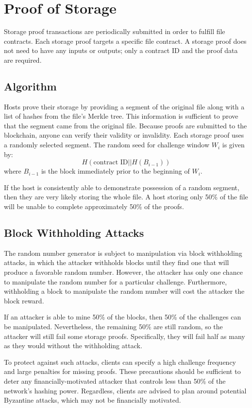 \documentclass[twocolumn]{article}
\begin{document}
\section{Proof of Storage}
\label{sec:storage}
Storage proof transactions are periodically submitted in order to fulfill file contracts.
Each storage proof targets a specific file contract.
A storage proof does not need to have any inputs or outputs; only a contract ID and the proof data are required.

\subsection{Algorithm}
Hosts prove their storage by providing a segment of the original file along with a list of hashes from the file's Merkle tree.
This information is sufficient to prove that the segment came from the original file.
Because proofs are submitted to the blockchain, anyone can verify their validity or invalidity.
Each storage proof uses a randomly selected segment.
The random seed for challenge window $W_i$ is given by:
\[
	H(\text{contract ID} || H(B_{i-1}))
\]
where $B_{i-1}$ is the block immediately prior to the beginning of $W_i$.

If the host is consistently able to demonstrate possession of a random segment, then they are very likely storing the whole file.
A host storing only 50\% of the file will be unable to complete approximately 50\% of the proofs.

\subsection{Block Withholding Attacks}
The random number generator is subject to manipulation via block withholding attacks, in which the attacker withholds blocks until they find one that will produce a favorable random number.
However, the attacker has only one chance to manipulate the random number for a particular challenge.
Furthermore, withholding a block to manipulate the random number will cost the attacker the block reward.

If an attacker is able to mine 50\% of the blocks, then 50\% of the challenges can be manipulated.
Nevertheless, the remaining 50\% are still random, so the attacker will still fail some storage proofs.
Specifically, they will fail half as many as they would without the withholding attack.

To protect against such attacks, clients can specify a high challenge frequency and large penalties for missing proofs.
These precautions should be sufficient to deter any financially-motivated attacker that controls less than 50\% of the network's hashing power.
Regardless, clients are advised to plan around potential Byzantine attacks, which may not be financially motivated.
\end{document}
